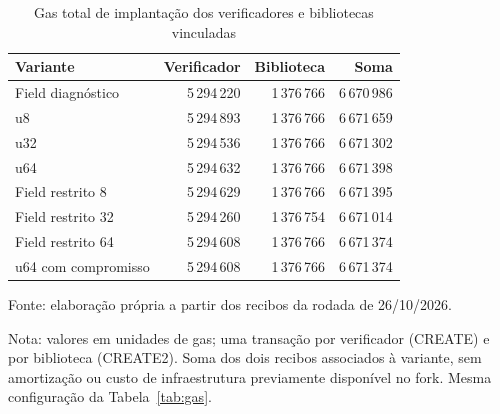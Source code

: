 \begin{table}[htbp]
\centering
\caption{Gas total de implantação dos verificadores e bibliotecas vinculadas}
\label{tab:implantacao}
\begin{tabular}{lrrr}
\hline
Variante & Verificador & Biblioteca & Soma \\
\hline
Field diagnóstico & 5\,294\,220 & 1\,376\,766 & 6\,670\,986 \\
u8 & 5\,294\,893 & 1\,376\,766 & 6\,671\,659 \\
u32 & 5\,294\,536 & 1\,376\,766 & 6\,671\,302 \\
u64 & 5\,294\,632 & 1\,376\,766 & 6\,671\,398 \\
Field restrito 8 & 5\,294\,629 & 1\,376\,766 & 6\,671\,395 \\
Field restrito 32 & 5\,294\,260 & 1\,376\,754 & 6\,671\,014 \\
Field restrito 64 & 5\,294\,608 & 1\,376\,766 & 6\,671\,374 \\
u64 com compromisso & 5\,294\,608 & 1\,376\,766 & 6\,671\,374 \\
\hline
\end{tabular}
\par\smallskip
\begin{minipage}{\textwidth}
\renewcommand{\baselinestretch}{1}\small
Fonte: elaboração própria a partir dos recibos da rodada de 26/10/2026.\par
Nota: valores em unidades de gas; uma transação por verificador (CREATE) e por biblioteca (CREATE2). Soma dos dois recibos associados à variante, sem amortização ou custo de infraestrutura previamente disponível no fork. Mesma configuração da Tabela~\ref{tab:gas}.
\end{minipage}
\end{table}
